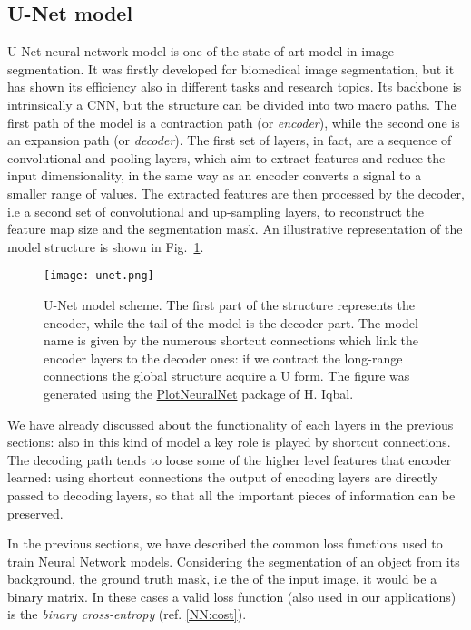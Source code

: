 \documentclass{standalone}
\begin{document}
\subsection[U-Net model]{U-Net model}\label{segmentation:Unet}

U-Net neural network model is one of the state-of-art model in image segmentation.
It was firstly developed for biomedical image segmentation, but it has shown its efficiency also in different tasks and research topics.
Its backbone is intrinsically a  CNN, but the structure can be divided into two macro paths.
The first path of the model is a contraction path (or \emph{encoder}), while the second one is an expansion path (or \emph{decoder}).
The first set of layers, in fact, are a sequence of convolutional and pooling layers, which aim to extract features and reduce the input dimensionality, in the same way as an encoder converts a signal to a smaller range of values.
The extracted features are then processed by the decoder, i.e a second set of convolutional and up-sampling layers, to reconstruct the feature map size and the segmentation mask.
An illustrative representation of the model structure is shown in Fig.~\ref{fig:unet}.

\begin{center}
\begin{figure}[htbp]
\centering
\texttt{[image: unet.png]}
\caption{U-Net model scheme.
The first part of the structure represents the encoder, while the tail of the model is the decoder part.
The model name is given by the numerous shortcut connections which link the encoder layers to the decoder ones: if we contract the long-range connections the global structure acquire a U form.
The figure was generated using the \href{https://github.com/HarisIqbal88/PlotNeuralNet}{PlotNeuralNet} package of H. Iqbal.
}
\label{fig:unet}
\end{figure}
\end{center}

We have already discussed about the functionality of each layers in the previous sections: also in this kind of model a key role is played by shortcut connections.
The decoding path tends to loose some of the higher level features that encoder learned: using shortcut connections the output of encoding layers are directly passed to decoding layers, so that all the important pieces of information can be preserved.

In the previous sections, we have described the common loss functions used to train Neural Network models.
Considering the  segmentation of an object from its background, the ground truth mask, i.e the  of the input image, it would be a binary matrix.
In these cases a valid loss function (also used in our applications) is the \emph{binary cross-entropy} (ref. \ref{NN:cost}).
\end{document}
